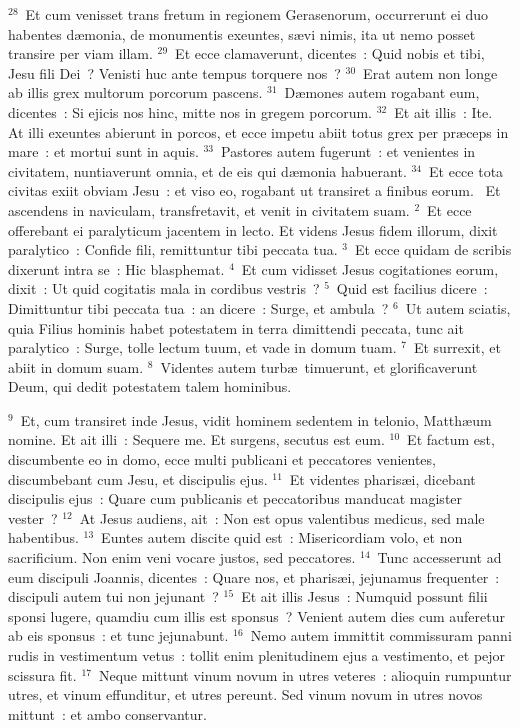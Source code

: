 ${}^{28}$~Et cum venisset trans fretum in regionem Gerasenorum, occurrerunt ei duo habentes d\ae monia, de monumentis exeuntes, s\ae vi nimis, ita ut nemo posset transire per viam illam.
${}^{29}$~Et ecce clamaverunt, dicentes~: Quid nobis et tibi, Jesu fili Dei~? Venisti huc ante tempus torquere nos~?
${}^{30}$~Erat autem non longe ab illis grex multorum porcorum pascens.
${}^{31}$~D\ae mones autem rogabant eum, dicentes~: Si ejicis nos hinc, mitte nos in gregem porcorum.
${}^{32}$~Et ait illis~: Ite. At illi exeuntes abierunt in porcos, et ecce impetu abiit totus grex per pr\ae ceps in mare~: et mortui sunt in aquis.
${}^{33}$~Pastores autem fugerunt~: et venientes in civitatem, nuntiaverunt omnia, et de eis qui d\ae monia habuerant.
${}^{34}$~Et ecce tota civitas exiit obviam Jesu~: et viso eo, rogabant ut transiret a finibus eorum.
~Et ascendens in naviculam, transfretavit, et venit in civitatem suam.
${}^{2}$~Et ecce offerebant ei paralyticum jacentem in lecto. Et videns Jesus fidem illorum, dixit paralytico~: Confide fili, remittuntur tibi peccata tua.
${}^{3}$~Et ecce quidam de scribis dixerunt intra se~: Hic blasphemat.
${}^{4}$~Et cum vidisset Jesus cogitationes eorum, dixit~: Ut quid cogitatis mala in cordibus vestris~?
${}^{5}$~Quid est facilius dicere~: Dimittuntur tibi peccata tua~: an dicere~: Surge, et ambula~?
${}^{6}$~Ut autem sciatis, quia Filius hominis habet potestatem in terra dimittendi peccata, tunc ait paralytico~: Surge, tolle lectum tuum, et vade in domum tuam.
${}^{7}$~Et surrexit, et abiit in domum suam.
${}^{8}$~Videntes autem turb\ae\ timuerunt, et glorificaverunt Deum, qui dedit potestatem talem hominibus.


${}^{9}$~Et, cum transiret inde Jesus, vidit hominem sedentem in telonio, Matth\ae um nomine. Et ait illi~: Sequere me. Et surgens, secutus est eum.
${}^{10}$~Et factum est, discumbente eo in domo, ecce multi publicani et peccatores venientes, discumbebant cum Jesu, et discipulis ejus.
${}^{11}$~Et videntes pharis\ae i, dicebant discipulis ejus~: Quare cum publicanis et peccatoribus manducat magister vester~?
${}^{12}$~At Jesus audiens, ait~: Non est opus valentibus medicus, sed male habentibus.
${}^{13}$~Euntes autem discite quid est~: Misericordiam volo, et non sacrificium. Non enim veni vocare justos, sed peccatores.
${}^{14}$~Tunc accesserunt ad eum discipuli Joannis, dicentes~: Quare nos, et pharis\ae i, jejunamus frequenter~: discipuli autem tui non jejunant~?
${}^{15}$~Et ait illis Jesus~: Numquid possunt filii sponsi lugere, quamdiu cum illis est sponsus~? Venient autem dies cum auferetur ab eis sponsus~: et tunc jejunabunt.
${}^{16}$~Nemo autem immittit commissuram panni rudis in vestimentum vetus~: tollit enim plenitudinem ejus a vestimento, et pejor scissura fit.
${}^{17}$~Neque mittunt vinum novum in utres veteres~: alioquin rumpuntur utres, et vinum effunditur, et utres pereunt. Sed vinum novum in utres novos mittunt~: et ambo conservantur.


